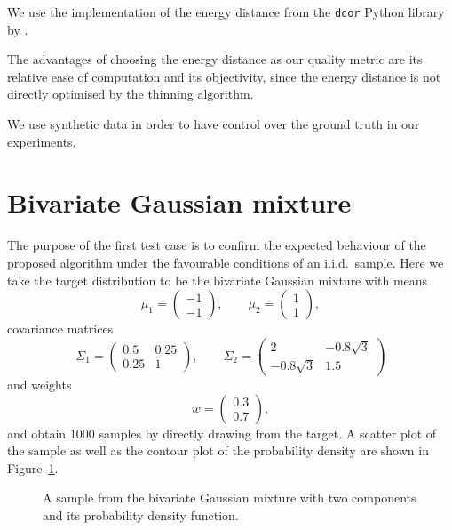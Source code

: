 \documentclass[11pt,a4paper]{report}
\begin{document}
We use the implementation of the energy distance from the \texttt{dcor} Python library by \cite{ramos-carrenoDcorDistanceCorrelation2023}.

The advantages of choosing the energy distance as our quality metric are its relative ease of computation and its objectivity, since the energy distance is not directly optimised by the thinning algorithm.

We use synthetic data in order to have control over the ground truth in our experiments.

\section{Bivariate Gaussian mixture}
\label{sec:gaussian-mixture}

The purpose of the first test case is to confirm the expected behaviour of the proposed algorithm under the favourable conditions of an i.i.d.\ sample. Here we take the target distribution to be the bivariate Gaussian mixture with means 
$$
\mu_1 = \begin{pmatrix} -1 \\ -1 \end{pmatrix}, \qquad
\mu_2 = \begin{pmatrix} 1 \\ 1 \end{pmatrix},
$$
covariance matrices
$$
\Sigma_1 = \begin{pmatrix}
0.5 & 0.25\\
0.25 & 1
\end{pmatrix}, \qquad
\Sigma_2 = \begin{pmatrix}
2 & -0.8 \sqrt{3}\\
-0.8 \sqrt{3} & 1.5
\end{pmatrix}
$$
and weights
$$w = \begin{pmatrix} 0.3 \\ 0.7 \end{pmatrix},$$
and obtain 1000 samples by directly drawing from the target. A scatter plot of the sample as well as the contour plot of the probability density are shown in Figure~\ref{fig:gmm:sample}.

\begin{figure}[h]
\centering
{}
\caption{A sample from the bivariate Gaussian mixture with two components and its probability density function.
\label{fig:gmm:sample}}
\end{figure}
\end{document}
